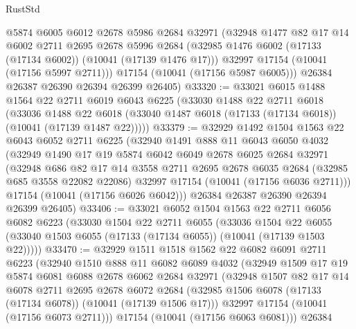 \begin{lexlean}{RustStd}
\begin{coremodule}
        @5874
        @6005
        @6012
        @2678
        @5986
        @2684
        @32971
        (@32948
          @1477
          @82
          @17
          @14
          @6002
          @2711
          @2695
          @2678
          @5996
          @2684
          (@32985 @1476 @6002 (@17133 (@17134 @6002)) (@10041 (@17139 @1476 @17)))
          @32997
          @17154
          (@10041 (@17156 @5997 @2711)))
        @17154
        (@10041 (@17156 @5987 @6005)))
      @26384
      @26387
      @26390
      @26394
      @26399
      @26405)
@33320 := @33021
    @6015
    @1488
    @1564
    @22
    @2711
    @6019
    @6043
    @6225
    (@33030
      @1488
      @22
      @2711
      @6018
      (@33036
        @1488
        @22
        @6018
        (@33040 @1487 @6018 (@17133 (@17134 @6018)) (@10041 (@17139 @1487 @22)))))
@33379 := @32929
    @1492
    @1504
    @1563
    @22
    @6043
    @6052
    @2711
    @6225
    (@32940
      @1491
      @888
      @11
      @6043
      @6050
      @4032
      (@32949
        @1490
        @17
        @19
        @5874
        @6042
        @6049
        @2678
        @6025
        @2684
        @32971
        (@32948
          @686
          @82
          @17
          @14
          @3558
          @2711
          @2695
          @2678
          @6035
          @2684
          (@32985 @685 @3558 @22082 @22086)
          @32997
          @17154
          (@10041 (@17156 @6036 @2711)))
        @17154
        (@10041 (@17156 @6026 @6042)))
      @26384
      @26387
      @26390
      @26394
      @26399
      @26405)
@33406 := @33021
    @6052
    @1504
    @1563
    @22
    @2711
    @6056
    @6082
    @6223
    (@33030
      @1504
      @22
      @2711
      @6055
      (@33036
        @1504
        @22
        @6055
        (@33040 @1503 @6055 (@17133 (@17134 @6055)) (@10041 (@17139 @1503 @22)))))
@33470 := @32929
    @1511
    @1518
    @1562
    @22
    @6082
    @6091
    @2711
    @6223
    (@32940
      @1510
      @888
      @11
      @6082
      @6089
      @4032
      (@32949
        @1509
        @17
        @19
        @5874
        @6081
        @6088
        @2678
        @6062
        @2684
        @32971
        (@32948
          @1507
          @82
          @17
          @14
          @6078
          @2711
          @2695
          @2678
          @6072
          @2684
          (@32985 @1506 @6078 (@17133 (@17134 @6078)) (@10041 (@17139 @1506 @17)))
          @32997
          @17154
          (@10041 (@17156 @6073 @2711)))
        @17154
        (@10041 (@17156 @6063 @6081)))
      @26384

\end{coremodule}
\end{lexlean}
